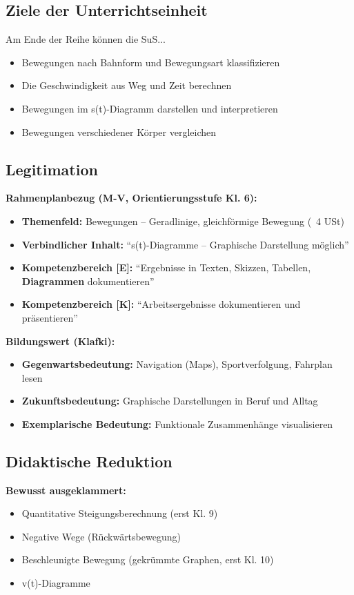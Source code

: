 \documentclass[11pt,a4paper]{article}
\begin{document}
\subsection{Ziele der Unterrichtseinheit}
Am Ende der Reihe können die SuS...
\begin{itemize}
    \item Bewegungen nach Bahnform und Bewegungsart klassifizieren
    \item Die Geschwindigkeit aus Weg und Zeit berechnen
    \item Bewegungen im s(t)-Diagramm darstellen und interpretieren
    \item Bewegungen verschiedener Körper vergleichen
\end{itemize}

\subsection{Legitimation}
\textbf{Rahmenplanbezug (M-V, Orientierungsstufe Kl. 6):}
\begin{itemize}
    \item \textbf{Themenfeld:} Bewegungen -- Geradlinige, gleichförmige Bewegung (~4 USt)
    \item \textbf{Verbindlicher Inhalt:} ``s(t)-Diagramme -- Graphische Darstellung möglich''
    \item \textbf{Kompetenzbereich [E]:} ``Ergebnisse in Texten, Skizzen, Tabellen, \textbf{Diagrammen} dokumentieren''
    \item \textbf{Kompetenzbereich [K]:} ``Arbeitsergebnisse dokumentieren und präsentieren''
\end{itemize}

\textbf{Bildungswert (Klafki):}
\begin{itemize}
    \item \textbf{Gegenwartsbedeutung:} Navigation (Maps), Sportverfolgung, Fahrplan lesen
    \item \textbf{Zukunftsbedeutung:} Graphische Darstellungen in Beruf und Alltag
    \item \textbf{Exemplarische Bedeutung:} Funktionale Zusammenhänge visualisieren
\end{itemize}

\subsection{Didaktische Reduktion}
\textbf{Bewusst ausgeklammert:}
\begin{itemize}
    \item Quantitative Steigungsberechnung (erst Kl. 9)
    \item Negative Wege (Rückwärtsbewegung)
    \item Beschleunigte Bewegung (gekrümmte Graphen, erst Kl. 10)
    \item v(t)-Diagramme
\end{itemize}
\end{document}
